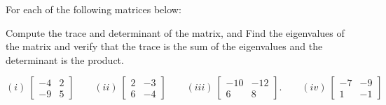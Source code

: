 \documentclass{ximera}
\begin{document}
\begin{exercise}%
    For each of the following matrices below:
    \begin{tasks}
        \task Compute the trace and determinant of the matrix, and
        \task Find the eigenvalues of the matrix and verify that the trace is the sum of the eigenvalues and the determinant is the product. 
    \end{tasks}
    \begin{equation*}
        (i) \ \begin{bmatrix} -4 & 2 \\ -9 & 5 \end{bmatrix} \qquad (ii) \ \begin{bmatrix} 2 & -3 \\ 6 & -4 \end{bmatrix} \qquad (iii)  \ \begin{bmatrix} -10& -12 \\ 6 & 8\end{bmatrix}. \qquad (iv) \ \begin{bmatrix} -7 & -9 \\ 1 & -1 \end{bmatrix}
    \end{equation*}
\end{exercise}
\end{document}
